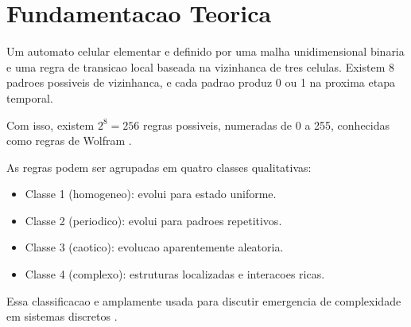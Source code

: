 \chapter{Fundamentacao Teorica}
\label{chap_fundamentacao_teorica}

Um automato celular elementar e definido por uma malha unidimensional binaria e uma regra de transicao local baseada na vizinhanca de tres celulas. Existem 8 padroes possiveis de vizinhanca, e cada padrao produz 0 ou 1 na proxima etapa temporal.

Com isso, existem $2^8=256$ regras possiveis, numeradas de 0 a 255, conhecidas como regras de Wolfram \cite{wolfram1983,wolfram2002}.

As regras podem ser agrupadas em quatro classes qualitativas:
\begin{itemize}
    \item Classe 1 (homogeneo): evolui para estado uniforme.
    \item Classe 2 (periodico): evolui para padroes repetitivos.
    \item Classe 3 (caotico): evolucao aparentemente aleatoria.
    \item Classe 4 (complexo): estruturas localizadas e interacoes ricas.
\end{itemize}

Essa classificacao e amplamente usada para discutir emergencia de complexidade em sistemas discretos \cite{chopard1998,wolfram2002}.
